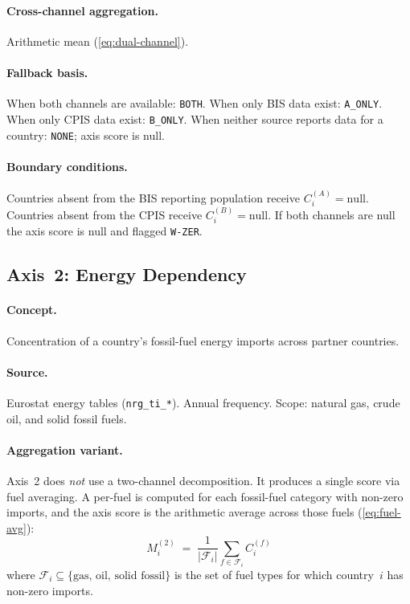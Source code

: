 \paragraph{Cross-channel aggregation.}
Arithmetic mean (\cref{eq:dual-channel}).

\paragraph{Fallback basis.}
When both channels are available: \texttt{BOTH}.  When only BIS data exist:
\texttt{A\_ONLY}.  When only CPIS data exist: \texttt{B\_ONLY}.  When
neither source reports data for a country: \texttt{NONE}; axis score is null.

\paragraph{Boundary conditions.}
Countries absent from the BIS reporting population receive
\(C_i^{(A)} = \text{null}\).  Countries absent from the CPIS receive
\(C_i^{(B)} = \text{null}\).  If both channels are null the axis score is
null and flagged \texttt{W-ZER}.

\subsection{Axis~2: Energy Dependency}\label{sec:axis:energy}

\paragraph{Concept.}
Concentration of a country's fossil-fuel energy imports across partner
countries.

\paragraph{Source.}
Eurostat energy tables (\texttt{nrg\_ti\_*}).  Annual frequency.  Scope:
natural gas, crude oil, and solid fossil fuels.

\paragraph{Aggregation variant.}
Axis~2 does \emph{not} use a two-channel decomposition.  It produces a single
score via fuel averaging.  A per-fuel \HHI is computed for each fossil-fuel
category with non-zero imports, and the axis score is the arithmetic average
across those fuels (\cref{eq:fuel-avg}):
%
\[
  M_i^{(2)}
  \;=\;
  \frac{1}{|\mathcal{F}_i|}
  \sum_{f \in \mathcal{F}_i} C_i^{(f)}
\]
%
where \(\mathcal{F}_i \subseteq \{\text{gas},\, \text{oil},\,
\text{solid fossil}\}\) is the set of fuel types for which
country~\(i\) has non-zero imports.

